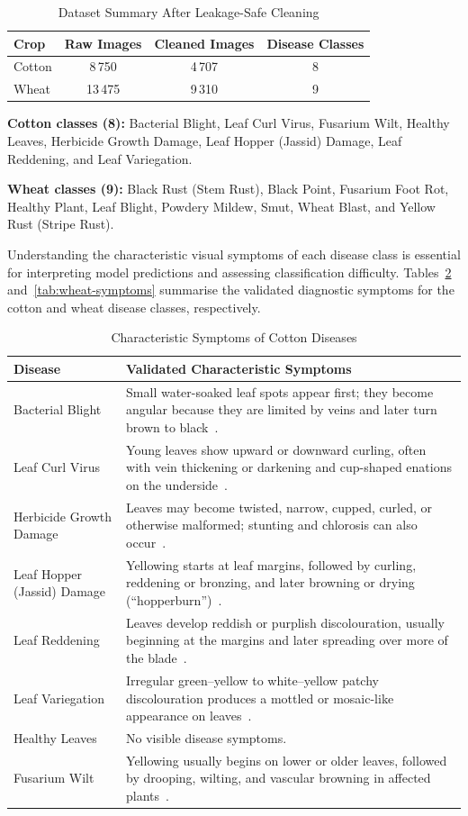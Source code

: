 \documentclass[12pt,a4paper]{report}
\begin{document}
\begin{table}[H]
\centering
\caption{Dataset Summary After Leakage-Safe Cleaning}
\label{tab:dataset-summary}
\begin{tabular}{lccc}
\toprule
Crop & Raw Images & Cleaned Images & Disease Classes \\
\midrule
Cotton & 8\,750 & 4\,707 & 8 \\
Wheat & 13\,475 & 9\,310 & 9 \\
\bottomrule
\end{tabular}
\end{table}

\textbf{Cotton classes (8):} Bacterial Blight, Leaf Curl Virus, Fusarium Wilt, Healthy Leaves, Herbicide Growth Damage, Leaf Hopper (Jassid) Damage, Leaf Reddening, and Leaf Variegation.

\textbf{Wheat classes (9):} Black Rust (Stem Rust), Black Point, Fusarium Foot Rot, Healthy Plant, Leaf Blight, Powdery Mildew, Smut, Wheat Blast, and Yellow Rust (Stripe Rust).

Understanding the characteristic visual symptoms of each disease class is essential for interpreting model predictions and assessing classification difficulty. Tables~\ref{tab:cotton-symptoms} and~\ref{tab:wheat-symptoms} summarise the validated diagnostic symptoms for the cotton and wheat disease classes, respectively.

\begin{table}[H]
\centering
\caption{Characteristic Symptoms of Cotton Diseases}
\label{tab:cotton-symptoms}
\begin{tabular}{lp{9.5cm}}
\toprule
Disease & Validated Characteristic Symptoms \\
\midrule
Bacterial Blight & Small water-soaked leaf spots appear first; they become angular because they are limited by veins and later turn brown to black~\cite{b26}. \\
Leaf Curl Virus & Young leaves show upward or downward curling, often with vein thickening or darkening and cup-shaped enations on the underside~\cite{b27}. \\
Herbicide Growth Damage & Leaves may become twisted, narrow, cupped, curled, or otherwise malformed; stunting and chlorosis can also occur~\cite{b28}. \\
Leaf Hopper (Jassid) Damage & Yellowing starts at leaf margins, followed by curling, reddening or bronzing, and later browning or drying (``hopperburn'')~\cite{b29}. \\
Leaf Reddening & Leaves develop reddish or purplish discolouration, usually beginning at the margins and later spreading over more of the blade~\cite{b30}. \\
Leaf Variegation & Irregular green--yellow to white--yellow patchy discolouration produces a mottled or mosaic-like appearance on leaves~\cite{b31}. \\
Healthy Leaves & No visible disease symptoms. \\
Fusarium Wilt & Yellowing usually begins on lower or older leaves, followed by drooping, wilting, and vascular browning in affected plants~\cite{b32}. \\
\bottomrule
\end{tabular}
\end{table}
\end{document}
